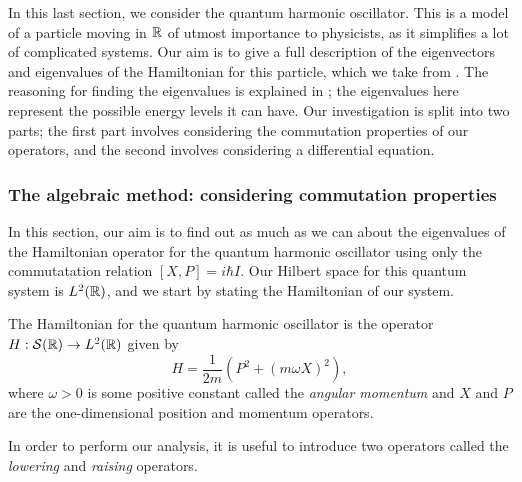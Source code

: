 In this last section, we consider the quantum harmonic oscillator. This is a model of a particle moving in $\mathbb{R}$ of utmost importance to physicists, as it simplifies a lot of complicated systems. Our aim is to give a full description of the eigenvectors and eigenvalues of the Hamiltonian for this particle, which we take from {\cite[Chapter 11]{Hall2013}}. The reasoning for finding the eigenvalues is explained in {\cite[p.14]{Hall2013}}; the eigenvalues here represent the possible energy levels it can have. Our investigation is split into two parts; the first part involves considering the commutation properties of our operators, and the second involves considering a differential equation.

\subsubsection{The algebraic method: considering commutation properties}

In this section, our aim is to find out as much as we can about the eigenvalues of the Hamiltonian operator for the quantum harmonic oscillator using only the commutatation relation $[X, P] = i \hbar I$. Our Hilbert space for this quantum system is $L^2 (\mathbb{R})$, and we start by stating the Hamiltonian of our system.


%
%


\begin{definition}
  The Hamiltonian for the quantum harmonic oscillator is the operator $H: \mathcal{S}(\mathbb{R}) \to L^2(\mathbb{R})$ given by
    \begin{equation*}
      H = \frac{1}{2m} \left( P^2 + (m \omega X)^2 \right),
    \end{equation*}
    where $\omega > 0$ is some positive constant called the {\emph{angular momentum}} and $X$ and $P$ are the one-dimensional position and momentum operators.
\end{definition}

 In order to perform our analysis, it is useful to introduce two operators called the {\emph{lowering}} and {\emph{raising}} operators.

